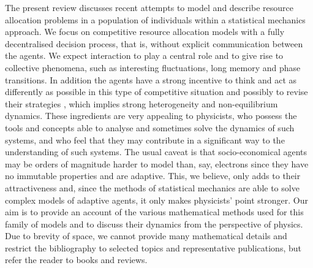 \documentclass[aps,twocolumn,nofootinbib,sortedaddress,reprint]{revtex4-1}
\begin{document}
The present review discusses recent attempts to model and describe resource allocation problems in a population of individuals within a statistical mechanics approach. We focus on competitive resource allocation models with a fully decentralised decision process, that is, without explicit communication between the agents. We expect interaction to play a central role and to give rise to collective phenomena, such as interesting fluctuations, long memory and phase transitions. In addition the agents have a strong incentive to think and act as differently as possible in this type of competitive situation and possibly to revise their strategies \cite{Arthur}, which implies strong heterogeneity and non-equilibrium dynamics. These ingredients are very appealing to physicists, who possess the tools and concepts able to analyse and sometimes solve the dynamics of such systems, and who feel that they may contribute in a significant way to the understanding of such systems.  The usual caveat is that socio-economical agents may be orders of magnitude harder to model than, say,  electrons since they have no immutable properties and are adaptive. This, we believe, only adds to their attractiveness and, since the methods of statistical mechanics are able to solve complex models of adaptive agents, it only makes physicists' point stronger. Our aim is to provide an  account of the various mathematical methods used for this family of models and to discuss their dynamics from the perspective of physics. Due to brevity of space, we cannot provide many mathematical details and restrict the bibliography to selected topics and representative publications, but refer the reader to books and reviews.
\end{document}
